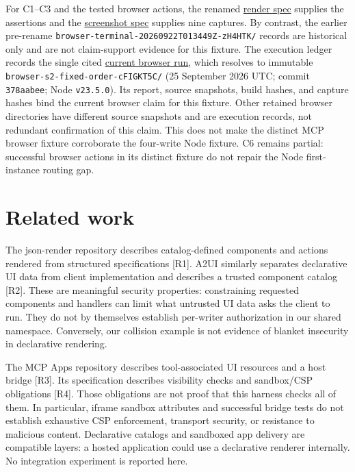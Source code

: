 \documentclass[11pt]{article}
\begin{document}
For C1--C3 and the tested browser actions, the renamed
\href{../tests/browser/render.spec.ts}{render spec} supplies the
assertions and the
\href{../tests/browser/screenshots.spec.ts}{screenshot spec} supplies
nine captures. By contrast, the earlier pre-rename
\texttt{browser-terminal-20260922T013449Z-zH4HTK/} records are
historical only and are not claim-support evidence for this fixture. The
execution ledger records the single cited
\href{./evidence/current-browser-run/}{current browser run}, which
resolves to immutable \texttt{browser-s2-fixed-order-cFIGKT5C/} (25
September 2026 UTC; commit \texttt{378aabee}; Node \texttt{v23.5.0}).
Its report, source snapshots, build hashes, and capture hashes bind the
current browser claim for this fixture. Other retained browser
directories have different source snapshots and are execution records,
not redundant confirmation of this claim. This does not make the
distinct MCP browser fixture corroborate the four-write Node fixture. C6
remains partial: successful browser actions in its distinct fixture do
not repair the Node first-instance routing gap.

\section{Related work}\label{related-work}

The json-render repository describes catalog-defined components and
actions rendered from structured specifications {[}R1{]}. A2UI similarly
separates declarative UI data from client implementation and describes a
trusted component catalog {[}R2{]}. These are meaningful security
properties: constraining requested components and handlers can limit
what untrusted UI data asks the client to run. They do not by themselves
establish per-writer authorization in our shared namespace. Conversely,
our collision example is not evidence of blanket insecurity in
declarative rendering.

The MCP Apps repository describes tool-associated UI resources and a
host bridge {[}R3{]}. Its specification describes visibility checks and
sandbox/CSP obligations {[}R4{]}. Those obligations are not proof that
this harness checks all of them. In particular, iframe sandbox
attributes and successful bridge tests do not establish exhaustive CSP
enforcement, transport security, or resistance to malicious content.
Declarative catalogs and sandboxed app delivery are compatible layers: a
hosted application could use a declarative renderer internally. No
integration experiment is reported here.
\end{document}
